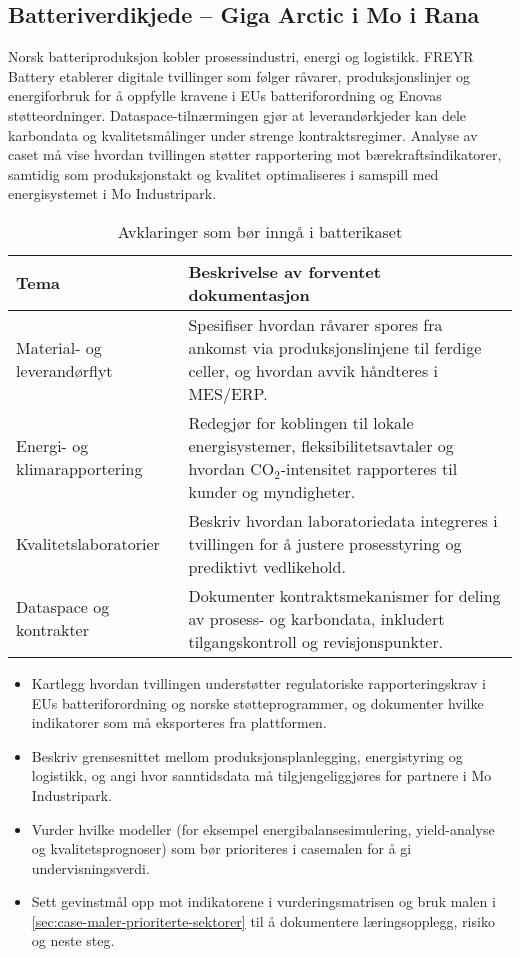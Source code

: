 \subsection*{Batteriverdikjede – Giga Arctic i Mo i Rana}
Norsk batteriproduksjon kobler prosessindustri, energi og logistikk. FREYR Battery etablerer digitale tvillinger som følger råvarer, produksjonslinjer og energiforbruk for å oppfylle kravene i EUs batteriforordning og Enovas støtteordninger.\citep{freyr2024giga,enova2023batteri,gaiax2023architecture,eu2023batteryregulation} Dataspace-tilnærmingen gjør at leverandørkjeder kan dele karbondata og kvalitetsmålinger under strenge kontraktsregimer. Analyse av caset må vise hvordan tvillingen støtter rapportering mot bærekraftsindikatorer, samtidig som produksjonstakt og kvalitet optimaliseres i samspill med energisystemet i Mo Industripark.

\begin{table}[h]
    \centering
    \caption{Avklaringer som bør inngå i batterikaset}
    \label{tab:batteri-fokus}
    \begin{tabular}{p{3.6cm}p{8.4cm}}
        \toprule
        Tema & Beskrivelse av forventet dokumentasjon \\
        \midrule
        Material- og leverandørflyt & Spesifiser hvordan råvarer spores fra ankomst via produksjonslinjene til ferdige celler, og hvordan avvik håndteres i MES/ERP. \\
        Energi- og klimarapportering & Redegjør for koblingen til lokale energisystemer, fleksibilitetsavtaler og hvordan CO$_2$-intensitet rapporteres til kunder og myndigheter. \\
        Kvalitetslaboratorier & Beskriv hvordan laboratoriedata integreres i tvillingen for å justere prosesstyring og prediktivt vedlikehold. \\
        Dataspace og kontrakter & Dokumenter kontraktsmekanismer for deling av prosess- og karbondata, inkludert tilgangskontroll og revisjonspunkter. \\
        \bottomrule
    \end{tabular}
\end{table}

\begin{itemize}
    \item Kartlegg hvordan tvillingen understøtter regulatoriske rapporteringskrav i EUs batteriforordning og norske støtteprogrammer, og dokumenter hvilke indikatorer som må eksporteres fra plattformen.\citep{eu2023batteryregulation,enova2023batteri}
    \item Beskriv grensesnittet mellom produksjonsplanlegging, energistyring og logistikk, og angi hvor sanntidsdata må tilgjengeliggjøres for partnere i Mo Industripark.
    \item Vurder hvilke modeller (for eksempel energibalansesimulering, yield-analyse og kvalitetsprognoser) som bør prioriteres i casemalen for å gi undervisningsverdi.
    \item Sett gevinstmål opp mot indikatorene i vurderingsmatrisen og bruk malen i \autoref{sec:case-maler-prioriterte-sektorer} til å dokumentere læringsopplegg, risiko og neste steg.
\end{itemize}


